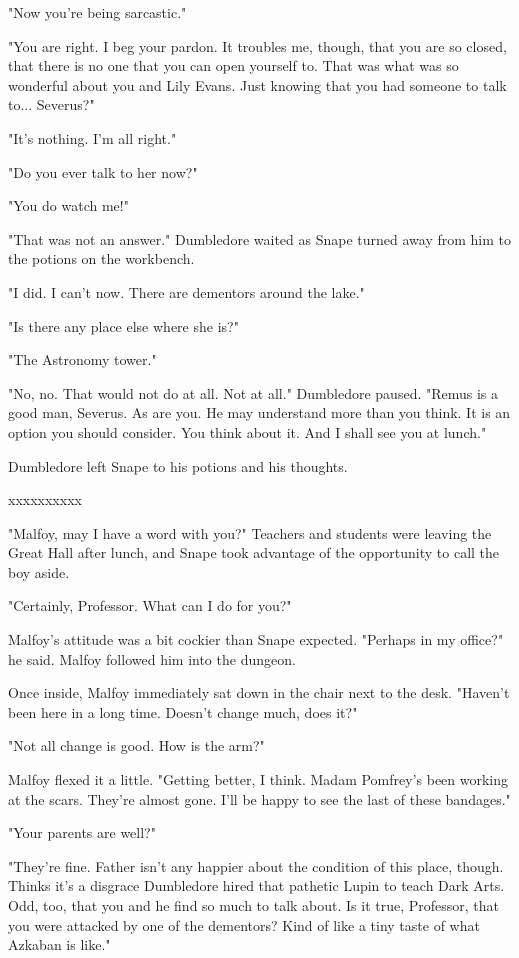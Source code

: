 \documentclass[a4paper,11pt]{article}
\begin{document}
"Now you're being sarcastic."

"You are right. I beg your pardon. It troubles me, though, that you are so closed, that there is no one that you can open yourself to. That was what was so wonderful about you and Lily Evans. Just knowing that you had someone to talk to... Severus?"

"It's nothing. I'm all right."

"Do you ever talk to her now?"

"You do watch me!"

"That was not an answer." Dumbledore waited as Snape turned away from him to the potions on the workbench.

"I did. I can't now. There are dementors around the lake."

"Is there any place else where she is?"

"The Astronomy tower."

"No, no. That would not do at all. Not at all." Dumbledore paused. "Remus is a good man, Severus. As are you. He may understand more than you think. It is an option you should consider. You think about it. And I shall see you at lunch."

Dumbledore left Snape to his potions and his thoughts.

xxxxxxxxxx

"Malfoy, may I have a word with you?" Teachers and students were leaving the Great Hall after lunch, and Snape took advantage of the opportunity to call the boy aside.

"Certainly, Professor. What can I do for you?"

Malfoy's attitude was a bit cockier than Snape expected. "Perhaps in my office?" he said. Malfoy followed him into the dungeon.

Once inside, Malfoy immediately sat down in the chair next to the desk. "Haven't been here in a long time. Doesn't change much, does it?"

"Not all change is good. How is the arm?"

Malfoy flexed it a little. "Getting better, I think. Madam Pomfrey's been working at the scars. They're almost gone. I'll be happy to see the last of these bandages."

"Your parents are well?"

"They're fine. Father isn't any happier about the condition of this place, though. Thinks it's a disgrace Dumbledore hired that pathetic Lupin to teach Dark Arts. Odd, too, that you and he find so much to talk about. Is it true, Professor, that you were attacked by one of the dementors? Kind of like a tiny taste of what Azkaban is like."
\end{document}
